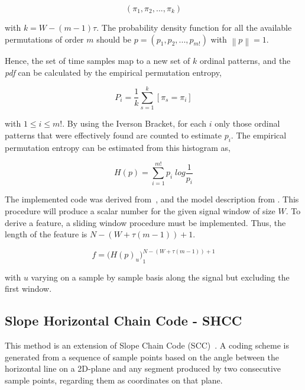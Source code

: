 \documentclass[brainsci,article,submit,moreauthors,pdftex,10pt,a4paper]{mdpi}
\begin{document}
\begin{equation}
(\pi_{1},\pi_{2},...,\pi_{k})
\label{eq:pesignal}
\end{equation}

\noindent with $k = W-(m-1) \tau$.  The probability density function for all the available permutations of order $m$ should be $ p = (p_1,p_2,...,p_{m!}) $ with $ \left\lVert p \right\lVert = 1 $.

Hence, the set of time samples map to a new set of $k$ ordinal patterns, and the \textit{pdf} can be calculated by the empirical permutation entropy,

\begin{equation}
P_i = \frac{1}{k} \sum_{s=1}^{k} \left[ \pi_{s} = \pi_{i} \right]
\label{eq:pesignal}
\end{equation}

\noindent with $1 \leq i \leq m!$.  By using the Iverson Bracket, for each $i$ only those ordinal patterns that were effectively found are counted to estimate $p_i$.  The empirical permutation entropy can be estimated from this histogram as,

\begin{equation}
H(p) = \sum_{i=1}^{m!} p_{i} \; log \frac{1}{p_{i}}
\label{eq:pesignal}
\end{equation}

The implemented code was derived from~\citep{Unakafova2013}, and the model description from \citep{Berger2017}.  This procedure will produce a scalar number for the given signal window of size $W$.  To derive a feature, a sliding window procedure must be implemented.  Thus, the length of the feature is $N - (W + \tau (m - 1)) + 1$.

\begin{equation}
f =  {\bigg ( H(p)_{u} \bigg )}_{1}^{N - (W + \tau (m - 1)) + 1}
\label{eq:multiclassificationrow}
\end{equation}

\noindent with $u$ varying on a sample by sample basis along the signal but excluding the first window.

\subsection{Slope Horizontal Chain Code - SHCC}

This method is an extension of Slope Chain Code (SCC)~\citep{Alvarado-Gonzalez2016}. A coding scheme is generated from a sequence of sample points based on the angle between the horizontal line on a 2D-plane and any segment produced by two consecutive sample points, regarding them as coordinates on that plane.  
\end{document}
